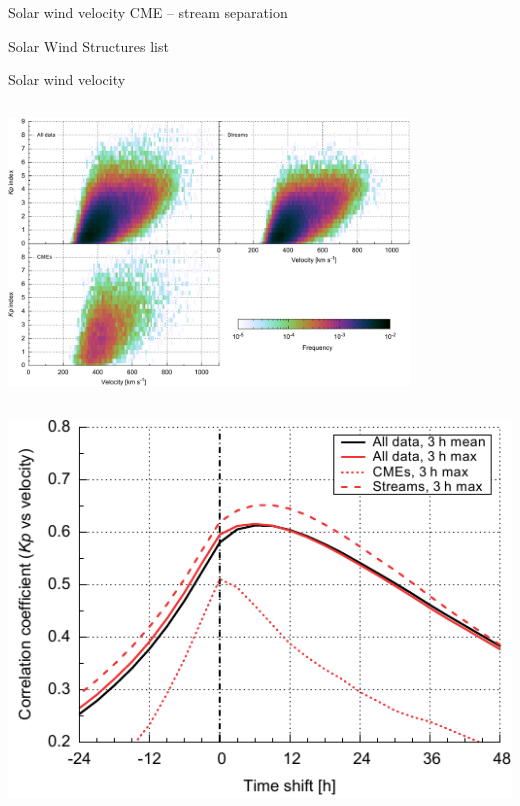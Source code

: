\begin{frame}[c]{Solar wind velocity}{}
	CME -- stream separation
	
	Solar Wind Structures list
\end{frame}
\begin{frame}[c]{Solar wind velocity}{}
	\begin{columns}[c]
	\column{\textwidth}
		
		\includegraphics[width=0.8\textwidth]{../figures_of_mine/chapter2/Kp_2dhistogram_V_sws_e.pdf}

	\end{columns}
\end{frame}
\begin{frame}[c]{}{}
	\begin{columns}[c]
		


		\includegraphics[width=\textwidth]{../figures_of_mine/chapter2/cc_lag_sws_f.pdf}
	
	\end{columns}
\end{frame}

